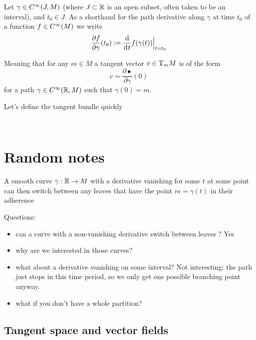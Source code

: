 	\begin{notation}
		Let $\gamma \in C^\infty(J, M)$ (where $J \subset \mathbb{R}$ is an open subset, often taken to be an interval), and $t_0 \in J$.
		As a shorthand for the path derivative along $\gamma$ at time $t_0$ of a function $f \in C^\infty(M)$ we write 
		$$
			\frac{\partial f}{\partial \gamma}(t_0) := \frac{\d}{\di{t}} f(\gamma(t)) \Big|_{t=t_0}
		$$

		Meaning that for any $m \in M$ a tangent vector $v \in \mathrm{T}_m{M}$ is of the form
		$$
			v = \frac{\partial \bullet}{\partial \gamma}(0)
		$$
		for a path $\gamma \in C^\infty(\mathbb{R}, M)$ such that $\gamma(0) = m$.
	\end{notation}


	Let's define the tangent bundle quickly


\newpage
~
\newpage

\section{Random notes}

	A smooth curve $\gamma: \mathbb{R} \to M$ with a derivative vanishing for some $t$ at some point can then switch between any leaves that have the point $m = \gamma(t)$ in their adherence

	Questions:
	\begin{itemize}
		\item can a curve with a non-vanishing derivative switch between leaves ? Yes
		\item why are we interested in those curves?
		\item what about a derivative vanishing on some interval? Not interesting: the path just stops in this time period, so we only get one possible branching point anyway.
		\item what if you don't have a whole partition?
	\end{itemize}


	\subsection{Tangent space and vector fields}

